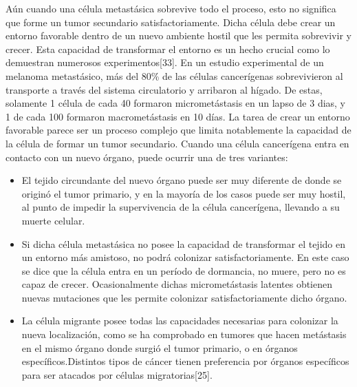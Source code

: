 \hspace{.1cm}Aún cuando una célula metastásica sobrevive todo el proceso, esto no significa que forme un tumor secundario satisfactoriamente. Dicha célula debe crear un entorno favorable dentro de un nuevo ambiente hostil que les permita sobrevivir y crecer. Esta capacidad de transformar el entorno es un hecho crucial como lo demuestran numerosos experimentos[33]. En un estudio experimental de un melanoma metastásico, más del 80\% de las células cancerígenas sobrevivieron al transporte a través del sistema circulatorio y arribaron al hígado. De estas, solamente 1 célula de cada 40 formaron micrometástasis en un lapso de 3 dias, y 1 de cada 100 formaron macrometástasis en 10 días. La tarea de crear un entorno favorable parece ser un proceso complejo que limita notablemente la capacidad de la célula de formar un tumor secundario. Cuando una célula cancerígena entra en contacto con un nuevo órgano, puede ocurrir una de tres variantes:
\begin{itemize}
    \item El tejido circundante del nuevo órgano puede ser muy diferente de donde se originó el tumor primario, y en la mayoría de los casos puede ser muy hostil, al punto de impedir la supervivencia de la célula cancerígena, llevando a su muerte celular.
    \item Si dicha célula metastásica no posee la capacidad de transformar el tejido en un entorno más amistoso, no podrá colonizar satisfactoriamente. En este caso se dice que la célula entra en un período de dormancia, no muere, pero no es capaz de crecer. Ocasionalmente dichas micrometástasis latentes obtienen nuevas mutaciones que les permite colonizar satisfactoriamente dicho órgano.
    \item La célula migrante posee todas las capacidades necesarias para colonizar la nueva localización, como se ha comprobado en tumores que hacen metástasis en el mismo órgano donde surgió el tumor primario, o en órganos específicos.Distintos tipos de cáncer tienen preferencia por órganos específicos para ser atacados por células migratorias[25].
\end{itemize}

